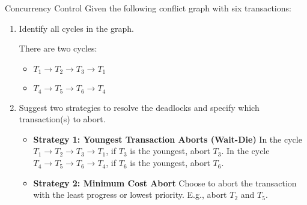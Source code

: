 \documentclass{article}
\begin{document}
\begin{exercise}{Concurrency Control}
  Given the following conflict graph with six transactions:
  \begin{center}\end{center}

  \begin{enumerate}
    \item Identify all cycles in the graph. \begin{solution}
        There are two cycles:
        \begin{itemize}
          \item $T_1 \rightarrow T_2 \rightarrow T_3 \rightarrow T_1$
          \item $T_4 \rightarrow T_5 \rightarrow T_6 \rightarrow T_4$
        \end{itemize}
      \end{solution}

    \item Suggest two strategies to resolve the deadlocks and specify which transaction(s) to abort. \begin{solution}
        \begin{itemize}
          \item \textbf{Strategy 1: Youngest Transaction Aborts (Wait-Die)}  
            In the cycle $T_1 \rightarrow T_2 \rightarrow T_3 \rightarrow T_1$, if $T_3$ is the youngest, abort $T_3$.  
            In the cycle $T_4 \rightarrow T_5 \rightarrow T_6 \rightarrow T_4$, if $T_6$ is the youngest, abort $T_6$.
          \item \textbf{Strategy 2: Minimum Cost Abort}  
            Choose to abort the transaction with the least progress or lowest priority. E.g., abort $T_2$ and $T_5$.
        \end{itemize}
      \end{solution}


\end{enumerate}
\end{exercise}
\end{document}
